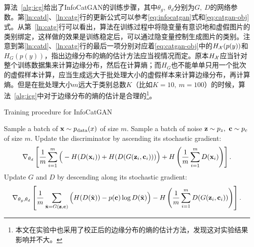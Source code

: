 算法~\ref{alg:icg}给出了InfoCatGAN的训练步骤，其中$\theta_g,~\theta_d$分别为$G, ~D$的网络参数。第\ref{ln:catd}、\ref{ln:catg}行的更新公式可以参考\eqref{eq:infocatgan}式和\eqref{eq:catgan-obj}式。从第~\ref{ln:catg}行可以看出，算法在训练过程中将隐变量有意识地和虚假图片的类别绑定，这样做的效果是训练稳定后，可以通过隐变量控制生成图片的类别。注意到第\ref{ln:catd}、\ref{ln:catg}行的最后一项分别对应着\eqref{eq:catgan-obj}中的$H_{\mathcal{X}}(p(y))$和$H_{G}(p(y))$，\citet{springenberg2015unsupervised}指出边缘分布的熵的估计方法应当视情况而定。原本$H_{\mathcal{X}}$应当针对整个训练数据集来计算边缘分布，然后在计算熵；而$H_G$也不能单单只用一个批次的虚假样本计算，应当生成远大于批处理大小的虚假样本来计算边缘分布，再计算熵。但是在批处理大小$m$远大于类别总数$K$（比如$K=10, ~m=100$）的时候，算法~\ref{alg:icg}中对于边缘分布的熵的估计是合理的\footnote{本文在实验中也采用了校正后的边缘分布的熵的估计方法，发现这对实验结果影响并不大。}。
\begin{algorithm}[htbp]
  \small
  \caption{Training procedure for InfoCatGAN}
  \label{alg:icg}
  \begin{algorithmic}[1]
      \State Sample a batch of $\mathbf{x} \sim p_{\text{data}}(x)$ of size $m$.
      \State Sample a batch of noise $\mathbf{z}\sim p_z, ~\mathbf{c}\sim p_c$ of size
      $m$.
      \State Update the discriminator by ascending its stochastic gradient:
      \label{ln:catd}
      \[
        \nabla_{\theta_d} \left[ 
          \frac{1}{m} \sum_{i=1}^m \Big( 
            - H(D(\mathbf{x}_i)) + H(D(G(\mathbf{z}_i, \mathbf{c}_i)))
          \Big) + H\left( \frac{1}{m}\sum_{i=1}^m D(\mathbf{x}_i) \right)
        \right].
      \]
      \State Update $G$ and $D$ by descending along its stochastic gradient:
      \label{ln:catg}
      \[
        \nabla_{\theta_g,\theta_d} \left[ 
          \frac{1}{m} \sum_{\tilde{\mathbf{x}} = G(\mathbf{z},\mathbf{c})} \Big(
            H(D(\tilde{\mathbf{x}})) - p(\mathbf{c})\log D(\tilde{\mathbf{x}})
          \Big)
          - H \left( 
            \frac{1}{m}\sum_{i=1}^m D(G(\mathbf{z}_i, \mathbf{c}_i))
          \right)
        \right].
      \]
    \EndFor
  \end{algorithmic}
\end{algorithm}



